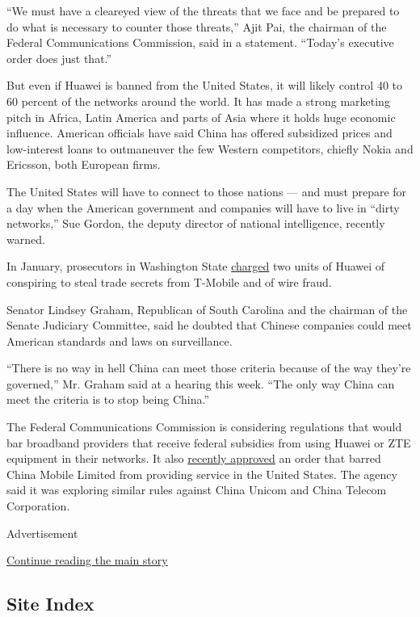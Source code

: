``We must have a cleareyed view of the threats that we face and be
prepared to do what is necessary to counter those threats,'' Ajit Pai,
the chairman of the Federal Communications Commission, said in a
statement. ``Today's executive order does just that.''

But even if Huawei is banned from the United States, it will likely
control 40 to 60 percent of the networks around the world. It has made a
strong marketing pitch in Africa, Latin America and parts of Asia where
it holds huge economic influence. American officials have said China has
offered subsidized prices and low-interest loans to outmaneuver the few
Western competitors, chiefly Nokia and Ericsson, both European firms.

The United States will have to connect to those nations --- and must
prepare for a day when the American government and companies will have
to live in ``dirty networks,'' Sue Gordon, the deputy director of
national intelligence, recently warned.

In January, prosecutors in Washington State
\href{https://www.justice.gov/opa/pr/chinese-telecommunications-device-manufacturer-and-its-us-affiliate-indicted-theft-trade}{charged}
two units of Huawei of conspiring to steal trade secrets from T-Mobile
and of wire fraud.

Senator Lindsey Graham, Republican of South Carolina and the chairman of
the Senate Judiciary Committee, said he doubted that Chinese companies
could meet American standards and laws on surveillance.

``There is no way in hell China can meet those criteria because of the
way they're governed,'' Mr. Graham said at a hearing this week. ``The
only way China can meet the criteria is to stop being China.''

The Federal Communications Commission is considering regulations that
would bar broadband providers that receive federal subsidies from using
Huawei or ZTE equipment in their networks. It also
\href{https://www.fcc.gov/document/fcc-denies-china-mobile-telecom-services-application}{recently
approved} an order that barred China Mobile Limited from providing
service in the United States. The agency said it was exploring similar
rules against China Unicom and China Telecom Corporation.

Advertisement

\protect\hyperlink{after-bottom}{Continue reading the main story}

\hypertarget{site-index}{%
\subsection{Site Index}\label{site-index}}

